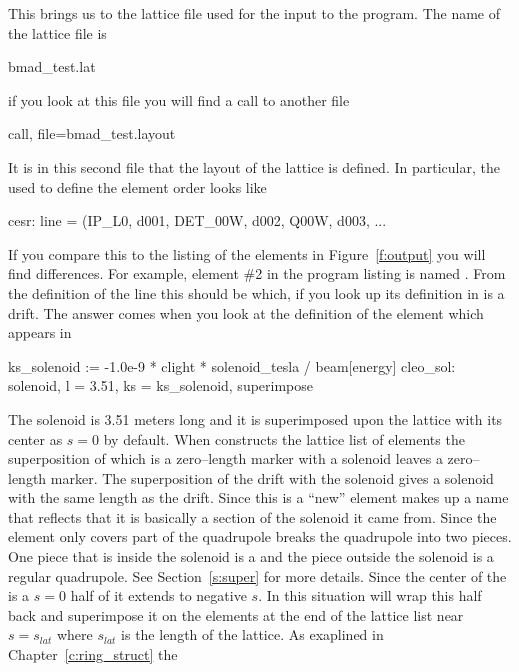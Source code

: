 {{{{{This brings us to the lattice file used for the input to the program.
The name of the lattice file is 
  \begin{example}
  bmad_test.lat
  \end{example} 
if you look at this file you will find a call to another file
  \begin{example}
  call, file=bmad_test.layout
  \end{example}
It is in this second file
that the layout of the lattice is defined. In particular, the  used
to define the element order looks like
\begin{example}
  cesr: line = (IP_L0, d001, DET_00W, d002, Q00W, d003, ...
\end{example}
If you compare this to the listing of the elements in
Figure~\ref{f:output} you will find differences. For example, element
\#2 in the program listing is named . From the
definition of the  line this should be  which, if
you look up its definition in  is a drift.  The
answer comes when you look at the definition of the 
element which appears in 
\begin{example}
  ks_solenoid    := -1.0e-9 * clight * solenoid_tesla / beam[energy]
  cleo_sol: solenoid, l = 3.51, ks = ks_solenoid, superimpose 
\end{example}
The solenoid is 3.51 meters long and it is superimposed upon the
lattice with its center as $s = 0$ by default. When 
constructs the lattice list of elements the superposition of
 which is a zero--length marker with a solenoid leaves a
zero--length marker. The superposition of the  drift with the
solenoid gives a solenoid with the same length as the drift. Since
this is a ``new'' element  makes up a name that
reflects that it is basically a section of the solenoid it came from.
Since the  element only covers part of the  quadrupole
 breaks the quadrupole into two pieces. One piece that
is inside the solenoid is a  and the piece outside the
solenoid is a regular quadrupole. See Section~\ref{s:super} for more
details. Since the center of the  is a $s = 0$ half of it
extends to negative $s$. In this situation  will wrap
this half back and superimpose it on the elements at the end of the lattice
list near $s = s_{lat}$ where $s_{lat}$ is the length of the lattice.
As exaplined in Chapter~\ref{c:ring_struct} the
}}}}}

